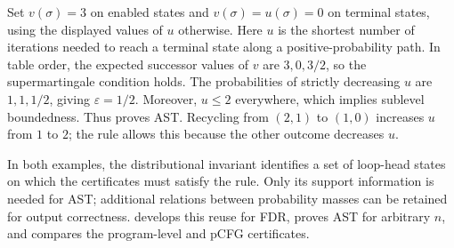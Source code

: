 Set $v(\sigma)=3$ on enabled states and $v(\sigma)=u(\sigma)=0$
on terminal states, using the displayed values of $u$ otherwise.
Here $u$ is the shortest number of iterations needed to reach a
terminal state along a positive-probability path.
In table order, the expected successor values of $v$ are $3,0,3/2$,
so the supermartingale condition holds.
The probabilities of strictly decreasing $u$ are $1,1,1/2$,
giving $\varepsilon=1/2$.
Moreover, $u\leq2$ everywhere, which implies sublevel boundedness.
Thus  proves AST.
Recycling from $(2,1)$ to $(1,0)$ increases $u$ from $1$ to $2$;
the rule allows this because the other outcome decreases $u$.

In both examples, the distributional invariant identifies a set of
loop-head states on which the certificates must satisfy the rule.
Only its support information is needed for AST; additional relations
between probability masses can be retained for output correctness.
 develops this reuse for FDR, proves AST for arbitrary
$n$, and compares the program-level and pCFG certificates.
